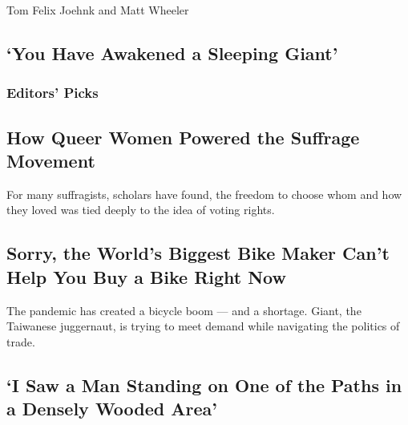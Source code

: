 Tom Felix Joehnk and Matt Wheeler

\hypertarget{you-have-awakened-a-sleeping-giant}{%
\subsection{`You Have Awakened a Sleeping
Giant'}\label{you-have-awakened-a-sleeping-giant}}

\hypertarget{editors-picks}{%
\subsubsection{Editors' Picks}\label{editors-picks}}

\href{/2020/08/14/us/queer-lesbian-women-suffrage.html}{}

\hypertarget{how-queer-women-powered-the-suffrage-movement}{%
\subsection{How Queer Women Powered the Suffrage
Movement}\label{how-queer-women-powered-the-suffrage-movement}}

For many suffragists, scholars have found, the freedom to choose whom
and how they loved was tied deeply to the idea of voting rights.

\href{/2020/08/17/business/giant-bikes-coronavirus-shortage.html}{}

\hypertarget{sorry-the-worlds-biggest-bike-maker-cant-help-you-buy-a-bike-right-now}{%
\subsection{Sorry, the World's Biggest Bike Maker Can't Help You Buy a
Bike Right
Now}\label{sorry-the-worlds-biggest-bike-maker-cant-help-you-buy-a-bike-right-now}}

The pandemic has created a bicycle boom --- and a shortage. Giant, the
Taiwanese juggernaut, is trying to meet demand while navigating the
politics of trade.

\href{/2020/08/17/business/giant-bikes-coronavirus-shortage.html}{}

\href{/2020/08/16/nyregion/metropolitan-diary.html}{}

\hypertarget{i-saw-a-man-standing-on-one-of-the-paths-in-a-densely-wooded-area}{%
\subsection{`I Saw a Man Standing on One of the Paths in a Densely
Wooded
Area'}\label{i-saw-a-man-standing-on-one-of-the-paths-in-a-densely-wooded-area}}

